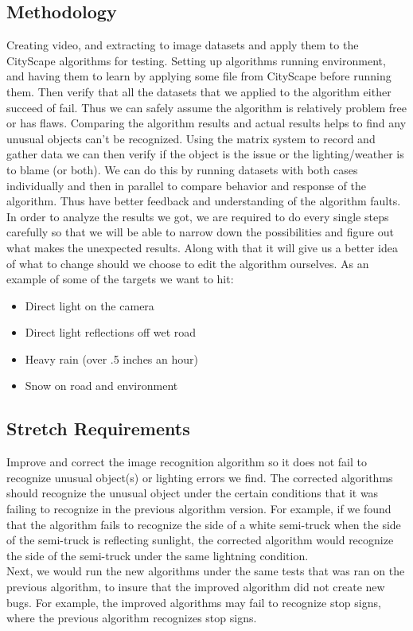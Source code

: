 \documentclass[10pt,draftclsnofoot,onecolumn,journal,compsoc]{IEEEtran}
\begin{document}
    \subsection{Methodology}
    Creating video, and extracting to image datasets and apply them to the CityScape algorithms for testing.
    Setting up algorithms running environment, and having them to learn by applying some file from CityScape before running them.
    Then verify that all the datasets that we applied to the algorithm either succeed of fail.
    Thus we can safely assume the algorithm is relatively problem free or has flaws.
    Comparing the algorithm results and actual results helps to find any unusual objects can't be recognized.
    Using the matrix system to record and gather data we can then verify if the object is the issue or the lighting/weather is to blame (or both).
    We can do this by running datasets with both cases individually and then in parallel to compare behavior and response of the algorithm.
    Thus have better feedback and understanding of the algorithm faults.
    In order to analyze the results we got, we are required to do every single steps carefully so that we will be able to narrow down the possibilities and figure out what makes the unexpected results. 
    Along with that it will give us a better idea of what to change should we choose to edit the algorithm ourselves.
    \newline
    As an example of some of the targets we want to hit:
    \begin{itemize}
         \item Direct light on the camera
         \item Direct light reflections off wet road
         \item Heavy rain (over .5 inches an hour)
         \item Snow on road and environment
    \end{itemize}
    
    \subsection{Stretch Requirements}

    Improve and correct the image recognition algorithm so it does not fail to recognize unusual object(s) or lighting errors we find. 
    The corrected algorithms should recognize the unusual object under the certain conditions that it was failing to recognize in the previous algorithm version.
    For example, if we found that the algorithm fails to recognize the side of a white semi-truck when the side of the semi-truck is reflecting sunlight, the corrected algorithm would recognize the side of the semi-truck under the same lightning condition.\\
    Next, we would run the new algorithms under the same tests that was ran on the previous algorithm, to insure that the improved algorithm did not create new bugs. 
    For example, the improved algorithms may fail to recognize stop signs, where the previous algorithm recognizes stop signs.
 
\end{document}
